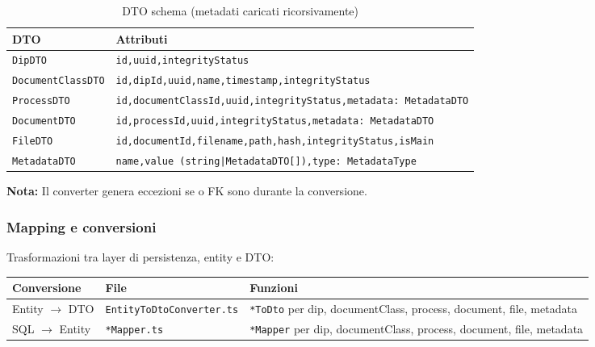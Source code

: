 \begin{table}[H]
  \centering
  \footnotesize
  \setlength{\tabcolsep}{4pt}
  \renewcommand{\arraystretch}{1.4}
  \begin{tabularx}{\textwidth}{|l|Y|}
    \hline
    \textbf{DTO} & \textbf{Attributi} \\
    \hline
    \texttt{DipDTO} & \texttt{id,\allowbreak uuid,\allowbreak integrityStatus} \\
    \hline
    \texttt{DocumentClassDTO} & \texttt{id,\allowbreak dipId,\allowbreak uuid,\allowbreak name,\allowbreak timestamp,\allowbreak integrityStatus} \\
    \hline
    \texttt{ProcessDTO} & \texttt{id,\allowbreak documentClassId,\allowbreak uuid,\allowbreak integrityStatus,\allowbreak metadata: MetadataDTO} \\
    \hline
    \texttt{DocumentDTO} & \texttt{id,\allowbreak processId,\allowbreak uuid,\allowbreak integrityStatus,\allowbreak metadata: MetadataDTO} \\
    \hline
    \texttt{FileDTO} & \texttt{id,\allowbreak documentId,\allowbreak filename,\allowbreak path,\allowbreak hash,\allowbreak integrityStatus,\allowbreak isMain} \\
    \hline
    \texttt{MetadataDTO} & \texttt{name,\allowbreak value (string|MetadataDTO[]),\allowbreak type: MetadataType} \\
    \hline
  \end{tabularx}
  \caption{DTO schema (metadati caricati ricorsivamente)}
  \label{tab:browsing:dtos}
\end{table}

\noindent
\textbf{Nota:} Il converter genera eccezioni se  o FK sono  durante la conversione.


\subsubsection{Mapping e conversioni}\label{mapping}
\label{sec:browsing:mapping}

\noindent
Trasformazioni tra layer di persistenza, entity e DTO:

\begin{table}[H]
  \centering
  \footnotesize
  \setlength{\tabcolsep}{4pt}
  \renewcommand{\arraystretch}{1.4}
  \begin{tabularx}{\textwidth}{|l|l|Y|}
    \hline
    \textbf{Conversione} & \textbf{File} & \textbf{Funzioni} \\
    \hline
    Entity $\to$ DTO & \texttt{EntityToDtoConverter.ts} & 
      \texttt{*ToDto} per dip, documentClass, process, document, file, metadata \\
    \hline
    SQL $\to$ Entity & \texttt{*Mapper.ts} & 
      \texttt{*Mapper} per dip, documentClass, process, document, file, metadata \\
    \hline
  \end{tabularx}
  \label{tab:browsing:mapping}
\end{table}

